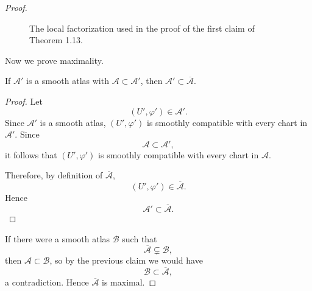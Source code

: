 \begin{proof}
\begin{figure}[htbp]
\caption{The local factorization used in the proof of the first claim of Theorem 1.13.}
\end{figure}

Now we prove maximality.

\begin{claim*}
If $\mathcal A'$ is a smooth atlas with $\mathcal A\subset \mathcal A'$, then $\mathcal A'\subset \overline{\mathcal A}$.
\end{claim*}

\begin{proof}
Let
\[
  (U',\varphi')\in \mathcal A'.
\]
Since $\mathcal A'$ is a smooth atlas, $(U',\varphi')$ is smoothly compatible with every chart in $\mathcal A'$.
Since
\[
  \mathcal A\subset \mathcal A',
\]
it follows that $(U',\varphi')$ is smoothly compatible with every chart in $\mathcal A$.

Therefore, by definition of $\overline{\mathcal A}$,
\[
  (U',\varphi')\in \overline{\mathcal A}.
\]
Hence
\[
  \mathcal A'\subset \overline{\mathcal A}.
\]
\end{proof}

If there were a smooth atlas $\mathcal B$ such that
\[
  \overline{\mathcal A}\subsetneq \mathcal B,
\]
then $\mathcal A\subset \mathcal B$, so by the previous claim we would have
\[
  \mathcal B\subset \overline{\mathcal A},
\]
a contradiction. Hence $\overline{\mathcal A}$ is maximal.


\end{proof}
